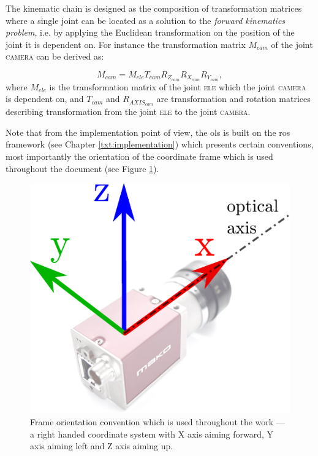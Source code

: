 The kinematic chain is designed as the composition of transformation matrices where a single joint can be located as a solution to the \textit{forward kinematics problem}, i.e. by applying the Euclidean transformation on the position of the joint it is dependent on. For instance the transformation matrix $M_{cam}$ of the joint \textsc{camera} can be derived as:

\begin{equation}
M_{cam} = M_{ele}T_{cam}R_{Z_{cam}}R_{X_{cam}}R_{Y_{cam}},
\end{equation}
where $M_{ele}$ is the transformation matrix of the joint \textsc{ele} which the joint \textsc{camera} is dependent on, and $T_{cam}$ and $R_{AXIS_{cam}}$ are transformation and rotation matrices describing transformation from the joint \textsc{ele} to the joint \textsc{camera}. 

Note that from the implementation point of view, the \gls{ols} is built on the \gls{ros} framework (see Chapter \ref{txt:implementation}) which presents certain conventions, most importantly the orientation of the coordinate frame which is used throughout the document (see Figure \ref{fig:frame_convention}).

\begin{figure}[htb]
	\centering
	\includegraphics[width=0.2\linewidth]{fig/frame_convention.pdf}
	\caption{Frame orientation convention which is used throughout the work --- a right handed coordinate system with X axis aiming forward, Y axis aiming left and Z axis aiming up.}
	\label{fig:frame_convention}
\end{figure}

